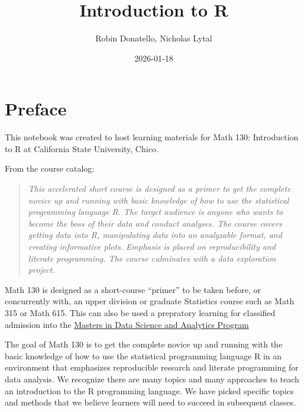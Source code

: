 \documentclass[
  letterpaper,
  DIV=11,
  numbers=noendperiod,
  oneside]{scrreprt}
\title{Introduction to R}
\author{Robin Donatello, Nicholas Lytal}
\date{2026-01-18}
\renewcommand*\contentsname{Table of contents}
\newcommand\contentsname{Table of contents}
\begin{document}
\maketitle

\renewcommand*\contentsname{Table of contents}
{
\hypersetup{linkcolor=}
\setcounter{tocdepth}{2}
\tableofcontents
}


\chapter*{Preface}\label{preface}


This notebook was created to host learning materials for Math 130:
Introduction to R at California State University, Chico.

From the course catalog:

\begin{quote}
\emph{This accelerated short course is designed as a primer to get the
complete novice up and running with basic knowledge of how to use the
statistical programming language R. The target audience is anyone who
wants to become the boss of their data and conduct analyses. The course
covers getting data into R, manipulating data into an analyzable format,
and creating informative plots. Emphasis is placed on reproducibility
and literate programming. The course culminates with a data exploration
project.}
\end{quote}

Math 130 is designed as a short-course ``primer'' to be taken before, or
concurrently with, an upper division or graduate Statistics course such
as Math 315 or Math 615. This can also be used a prepratory learning for
classified admission into the
\href{https://www.csuchico.edu/math/degrees/msdsa.shtml}{Masters in Data
Science and Analytics Program}{}

The goal of Math 130 is to get the complete novice up and running with
the basic knowledge of how to use the statistical programming language R
in an environment that emphasizes reproducible research and literate
programming for data analysis. We recognize there are many topics and
many approaches to teach an introduction to the R programming language.
We have picked specific topics and methods that we believe learners will
need to succeed in subsequent classes.
\end{document}
